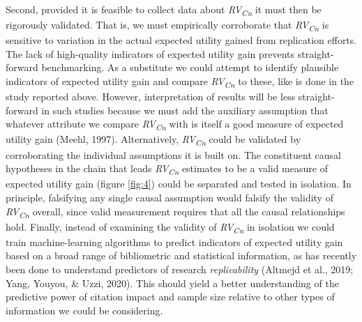 \documentclass[
  english,
  jou,floatsintext]{apa6}
\begin{document}
Second, provided it is feasible to collect data about \emph{RV\textsubscript{Cn}} it must then be rigorously validated. That is, we must empirically corroborate that \emph{RV\textsubscript{Cn}} is sensitive to variation in the actual expected utility gained from replication efforts. The lack of high-quality indicators of expected utility gain prevents straight-forward benchmarking. As a substitute we could attempt to identify plausible indicators of expected utility gain and compare \emph{RV\textsubscript{Cn}} to these, like is done in the study reported above. However, interpretation of results will be less straight-forward in such studies because we must add the auxiliary assumption that whatever attribute we compare \emph{RV\textsubscript{Cn}} with is itself a good measure of expected utility gain (Meehl, 1997). Alternatively, \emph{RV\textsubscript{Cn}} could be validated by corroborating the individual assumptions it is built on. The constituent causal hypotheses in the chain that leads \emph{RV\textsubscript{Cn}} estimates to be a valid measure of expected utility gain (figure \ref{fig:4}) could be separated and tested in isolation. In principle, falsifying any single causal assumption would falsify the validity of \emph{RV\textsubscript{Cn}} overall, since valid measurement requires that all the causal relationships hold. Finally, instead of examining the validity of \emph{RV\textsubscript{Cn}} in isolation we could train machine-learning algorithms to predict indicators of expected utility gain based on a broad range of bibliometric and statistical information, as has recently been done to understand predictors of research \emph{replicability} (Altmejd et al., 2019; Yang, Youyou, \& Uzzi, 2020). This should yield a better understanding of the predictive power of citation impact and sample size relative to other types of information we could be considering.
\end{document}
